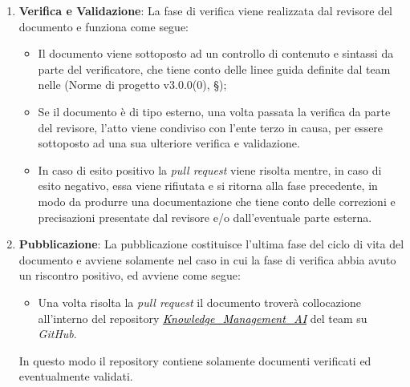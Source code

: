 \documentclass[10pt, a4paper]{article}
\begin{document}
\begin{enumerate}
    \item \textbf{Verifica e Validazione}: La fase di verifica viene realizzata dal revisore del documento e funziona come segue:
    \begin{itemize}
        \item Il documento viene 
        sottoposto ad un controllo di contenuto e sintassi da parte del verificatore, che tiene conto delle linee guida definite dal team nelle (Norme di progetto v3.0.0(0), \S {});
        \item Se il documento è di tipo esterno, una volta passata la verifica da parte del revisore, l'atto viene condiviso con l'ente terzo in causa, 
        per essere sottoposto ad una sua ulteriore verifica e validazione.
        \item In caso di esito positivo la \textit{pull request} viene risolta mentre, in caso di esito negativo, essa viene rifiutata e si ritorna alla 
        fase precedente, in modo da produrre una documentazione che tiene conto delle correzioni e precisazioni presentate dal revisore e/o 
        dall'eventuale parte esterna.
    \end{itemize}
     
    \item \textbf{Pubblicazione}: La pubblicazione costituisce l'ultima fase del ciclo di vita del documento e avviene solamente nel caso in cui 
    la fase di verifica abbia avuto un riscontro positivo, ed avviene come segue:
    \begin{itemize}
        \item Una volta risolta la \textit{pull request} il documento troverà collocazione 
        all'interno del repository \href{https://github.com/sweetcode-team/Knowledge_Management_AI}{\textcolor{black}{\textit{Knowledge\_Management\_AI}}} 
        del team su \textit{GitHub}.
    \end{itemize}
     In questo modo il repository contiene solamente documenti verificati ed eventualmente validati.
\end{enumerate}
\end{document}
